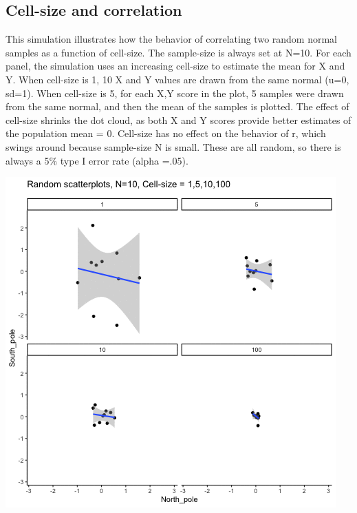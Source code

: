 \documentclass[]{book}
\begin{document}
\hypertarget{cell-size-and-correlation}{%
\subsection{Cell-size and correlation}\label{cell-size-and-correlation}}

This simulation illustrates how the behavior of correlating two random normal samples as a function of cell-size. The sample-size is always set at N=10. For each panel, the simulation uses an increasing cell-size to estimate the mean for X and Y. When cell-size is 1, 10 X and Y values are drawn from the same normal (u=0, sd=1). When cell-size is 5, for each X,Y score in the plot, 5 samples were drawn from the same normal, and then the mean of the samples is plotted. The effect of cell-size shrinks the dot cloud, as both X and Y scores provide better estimates of the population mean = 0. Cell-size has no effect on the behavior of r, which swings around because sample-size N is small. These are all random, so there is always a 5\% type I error rate (alpha =.05).

\includegraphics{gifs/cellsizeCor-1.gif}
\end{document}
